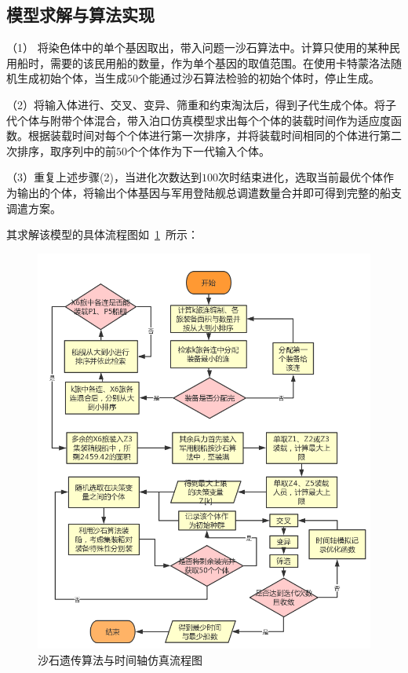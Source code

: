 \documentclass{whutmod}
\begin{document}
     \subsection{模型求解与算法实现}


   	 （1） 将染色体中的单个基因取出，带入问题一沙石算法中。计算只使用的某种民用船时，需要的该民用船的数量，作为单个基因的取值范围。在使用卡特蒙洛法随机生成初始个体，当生成$50$个能通过沙石算法检验的初始个体时，停止生成。
   	 
   	 （2）将输入体进行、交叉、变异、筛重和约束淘汰后，得到子代生成个体。将子代个体与附带个体混合，带入泊口仿真模型求出每个个体的装载时间作为适应度函数。根据装载时间对每个个体进行第一次排序，并将装载时间相同的个体进行第二次排序，取序列中的前$50$个个体作为下一代输入个体。

   （3）重复上述步骤(2)，当进化次数达到$100$次时结束进化，选取当前最优个体作为输出的个体，将输出个体基因与军用登陆舰总调遣数量合并即可得到完整的船支调遣方案。


    	 
    	 其求解该模型的具体流程图如~\ref{dierwen}~所示：
    \begin{figure}[H]
    	\centering
    	\includegraphics[width=\textwidth]{figures/dierwen.png}
    	\caption{沙石遗传算法与时间轴仿真流程图}\label{dierwen}
    \end{figure}
     
\end{document}
